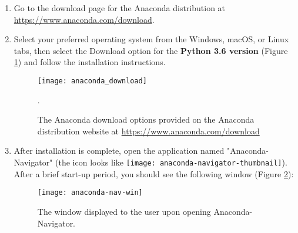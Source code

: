 \begin{enumerate}
    \item Go to the download page for the Anaconda distribution at \\ \url{https://www.anaconda.com/download}. 
    \item Select your preferred operating system from the Windows, macOS, or Linux tabs, then select the Download option for the \textbf{Python 3.6 version} (Figure \ref{anaconda_download}) and follow the installation instructions.
    \begin{figure}[h]
        \begin{center}
        \texttt{[image: anaconda\_download]}
        \caption{The Anaconda download options provided on the Anaconda distribution website at \protect \url{https://www.anaconda.com/download}}.
        \label{anaconda_download}
        \end{center}
    \end{figure}


    \item After installation is complete, open the application named "Anaconda-Navigator" (the icon looks like \texttt{[image: anaconda-navigator-thumbnail]}). After a brief start-up period, you should see the following window (Figure \ref{anaconda-nav-win}):
    \begin{figure}[htbp]
        \begin{center}
        \texttt{[image: anaconda-nav-win]}
        \caption{The window displayed to the user upon opening Anaconda-Navigator.}
        \label{anaconda-nav-win}
        \end{center}
    \end{figure}
\end{enumerate}

